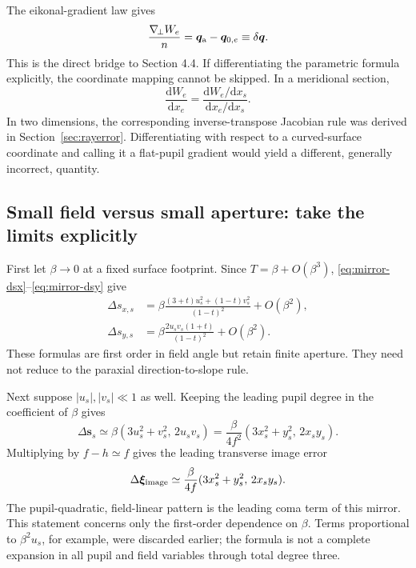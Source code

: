 \documentclass[11pt,a4paper]{article}
\numberwithin{equation}{section}
\newcommand{\dd}{\mathrm{d}}
\newcommand{\gradp}{\nabla_{\!\perp}}
\newcommand{\vct}[1]{\bm{#1}}
\begin{document}
The eikonal-gradient law gives
\begin{equation}
 \frac{\gradp W_e}{n}
 =\vct q_{\rm a}-\vct q_{0,e}
 \equiv\delta\vct q.
 \label{eq:mirror-opd-gradient}
\end{equation}
This is the direct bridge to Section 4.4.
If differentiating the parametric formula explicitly, the coordinate
mapping cannot be skipped. In a meridional section,
\begin{equation}
 \frac{\dd W_e}{\dd x_e}
 =\frac{\dd W_e/\dd x_s}{\dd x_e/\dd x_s}.
 \label{eq:mirror-chain}
\end{equation}
In two dimensions, the corresponding inverse-transpose Jacobian rule
was derived in Section~\ref{sec:rayerror}.
Differentiating with respect to a curved-surface coordinate and calling
it a flat-pupil gradient would yield a different, generally incorrect,
quantity.

\subsection{Small field versus small aperture: take the limits explicitly}
First let $\beta\to0$ at a fixed surface footprint. Since
$T=\beta+O(\beta^3)$, \eqref{eq:mirror-dsx}--\eqref{eq:mirror-dsy} give
\begin{align}
 \Delta s_{x,s}
 &=\beta\frac{(3+t)u_s^2+(1-t)v_s^2}{(1-t)^2}
   +O(\beta^2),\\
 \Delta s_{y,s}
 &=\beta\frac{2u_sv_s(1+t)}{(1-t)^2}
   +O(\beta^2).
 \label{eq:mirror-small-field}
\end{align}
These formulas are first order in field angle but retain finite
aperture. They need not reduce to the paraxial direction-to-slope rule.

Next suppose $|u_s|,|v_s|\ll1$ as well. Keeping the leading pupil degree
in the coefficient of $\beta$ gives
\begin{equation}
 \boxed{\Delta\vct s_s
 \simeq\beta(3u_s^2+v_s^2,\,2u_sv_s)
 =\frac{\beta}{4f^2}(3x_s^2+y_s^2,\,2x_sy_s).}
 \label{eq:mirror-primary}
\end{equation}
Multiplying by $f-h\simeq f$ gives the leading transverse image error
\begin{equation}
 \Delta\vct\xi_{\rm image}
 \simeq\frac{\beta}{4f}(3x_s^2+y_s^2,\,2x_sy_s).
\end{equation}
The pupil-quadratic, field-linear pattern is the leading coma term of
this mirror. This statement concerns only the first-order dependence
on $\beta$. Terms proportional to $\beta^2u_s$, for example, were
discarded earlier; the formula is not a complete expansion in all
pupil and field variables through total degree three.
\end{document}
